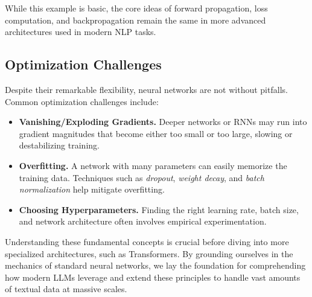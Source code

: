 \noindent
While this example is basic, the core ideas of forward propagation, loss computation, and backpropagation remain the same in more advanced architectures used in modern NLP tasks.

\subsection{Optimization Challenges}
\noindent
Despite their remarkable flexibility, neural networks are not without pitfalls. Common optimization challenges include:
\begin{itemize}
    \item \textbf{Vanishing/Exploding Gradients.} Deeper networks or RNNs may run into gradient magnitudes that become either too small or too large, slowing or destabilizing training.
    \item \textbf{Overfitting.} A network with many parameters can easily memorize the training data. Techniques such as \emph{dropout}, \emph{weight decay}, and \emph{batch normalization} help mitigate overfitting.
    \item \textbf{Choosing Hyperparameters.} Finding the right learning rate, batch size, and network architecture often involves empirical experimentation.
\end{itemize}

\noindent
Understanding these fundamental concepts is crucial before diving into more specialized architectures, such as Transformers. By grounding ourselves in the mechanics of standard neural networks, we lay the foundation for comprehending how modern LLMs leverage and extend these principles to handle vast amounts of textual data at massive scales.
